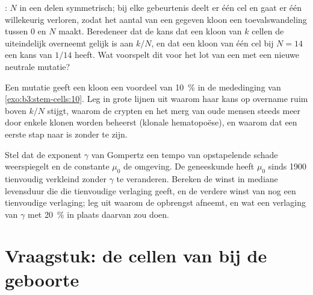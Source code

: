 \begin{exercise}[$\star\star\star$]\label{exo:b3:stem-cells:10}
: $N$  in een  delen symmetrisch; bij elke
gebeurtenis deelt er één cel en gaat er één willekeurig verloren, zodat
het aantal van een gegeven kloon een toevalswandeling tussen $0$ en $N$
maakt. Beredeneer dat de kans dat een kloon van $k$ cellen de 
uiteindelijk overneemt gelijk is aan $k/N$, en dat een kloon van één
cel bij $N = 14$ een kans van $1/14$ heeft. Wat voorspelt dit voor het
lot van een  met een nieuwe neutrale mutatie?
\end{exercise}

\begin{exercise}[$\star\star\star$]\label{exo:b3:stem-cells:11}
Een mutatie geeft een kloon  een voordeel van \qty{10}{\%} in
de mededinging van \cref{exo:b3:stem-cells:10}. Leg in grote lijnen uit
waarom haar kans op overname ruim boven $k/N$ stijgt, waarom de crypten
en het merg van oude mensen steeds meer door enkele klonen worden
beheerst (klonale hematopoëse), en waarom dat een eerste stap naar
 is zonder  te zijn.
\end{exercise}

\begin{exercise}[$\star\star\star$]\label{exo:b3:stem-cells:12}
Stel dat de exponent $\gamma$ van Gompertz een tempo van opstapelende
schade weerspiegelt en de constante $\mu_{0}$ de omgeving. De
geneeskunde heeft $\mu_{0}$ sinds 1900 tienvoudig verkleind zonder
$\gamma$ te veranderen. Bereken de winst in mediane levensduur die die
tienvoudige verlaging geeft, en de verdere winst van nog een
tienvoudige verlaging; leg uit waarom de opbrengst afneemt, en wat een
verlaging van $\gamma$ met \qty{20}{\%} in plaats daarvan zou doen.
\end{exercise}

\section{Vraagstuk: de cellen van bij de geboorte}

